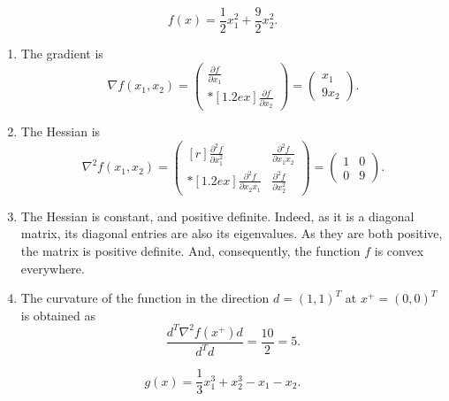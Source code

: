 
\[
  f(x)=\frac{1}{2}x_1^2+\frac{9}{2}x_2^2.
\]

\begin{enumerate}
\item The gradient is
$$\nabla f(x_1,x_2) = \begin{pmatrix}
    \frac{\partial f}{\partial x_1}\\*[1.2ex]
    \frac{\partial f}{\partial x_2}
\end{pmatrix} =
\begin{pmatrix}
    x_1 \\
    9x_2 
\end{pmatrix}.$$

\item The Hessian is 
$$\nabla^2 f(x_1,x_2) = \begin{pmatrix*}[r]
    \frac{\partial^2 f}{\partial x_1^2} & \frac{\partial^2 f}{\partial x_1x_2} \\*[1.2ex]
    \frac{\partial^2 f}{\partial x_2x_1} & \frac{\partial^2 f}{\partial x_2^2}
\end{pmatrix*} =
\begin{pmatrix}
    1 & 0 \\
    0 & 9 
\end{pmatrix}.$$

\item The Hessian is constant, and positive definite. Indeed, as it is
  a diagonal matrix, its diagonal entries are also its eigenvalues. As
  they are both positive, the matrix is positive definite. And,
  consequently, the function $f$ is convex everywhere. 

\item The curvature of the function in the direction $d=(1,1)^T$ at  $x^+=(0,0)^T$ is
  obtained as
$$\frac{d^T\nabla^2 f(x^+) d}{d^Td} = \frac{10}{2} = 5.$$
\end{enumerate}

\clearpage
\[
  g(x) =\frac{1}{3}x_1^3+x_2^3-x_1-x_2.
\]


